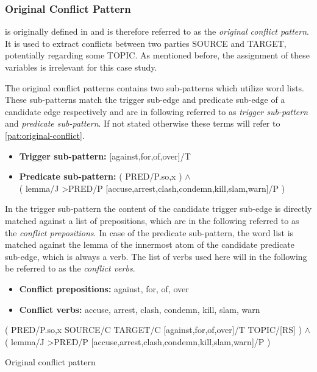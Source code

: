 \documentclass[11pt]{scrreprt}
\let\citef\cite  %
\let\cite\parencite  %
\begin{document}
\subsubsection{Original Conflict Pattern}
 is originally defined in \citef[p.~22]{menezesSemanticHypergraphs2021} and is therefore referred to as the \textit{original conflict pattern}. It is used to extract conflicts between two parties \textsf{SOURCE} and \textsf{TARGET}, potentially regarding some \textsf{TOPIC}. As mentioned before, the assignment of these variables is irrelevant for this case study.

The original conflict patterns contains two sub-patterns which utilize word lists. These sub-patterns match the trigger sub-edge and predicate sub-edge of a candidate edge respectively and are in following referred to as \textit{trigger sub-pattern} and \textit{predicate sub-pattern}. If not stated otherwise these terms will refer to \cref{pat:original-conflict}. 

\begin{itemize}
	\item \textbf{\textsf{Trigger sub-pattern:}} \textsf{[against,for,of,over]/T}
	\item \textbf{\textsf{Predicate sub-pattern:}}
		\textsf{( PRED/P.{so,x} ) \(\wedge\) \\ ( lemma/J >PRED/P [accuse,arrest,clash,condemn,kill,slam,warn]/P )}
\end{itemize}

In the trigger sub-pattern the content of the candidate trigger sub-edge is directly matched against a list of prepositions, which are in the following referred to as the \textit{conflict prepositions}. In case of the predicate sub-pattern, the word list is matched against the lemma of the innermost atom of the candidate predicate sub-edge, which is always a verb. The list of verbs used here will in the following be referred to as the \textit{conflict verbs}.

\begin{itemize}
	\item \textbf{\textsf{Conflict prepositions:}} against, for, of, over
	\item \textbf{\textsf{Conflict verbs:}} accuse, arrest, clash, condemn, kill, slam, warn
\end{itemize}


\begin{pattern}
  \normalfont\sffamily
  \centering
  ( PRED/P.{so,x} SOURCE/C TARGET/C [against,for,of,over]/T TOPIC/[RS] ) \(\wedge\) \\
  ( lemma/J >PRED/P [accuse,arrest,clash,condemn,kill,slam,warn]/P )
  \caption{Original conflict pattern}
  \label{pat:original-conflict}
\end{pattern}
\end{document}
